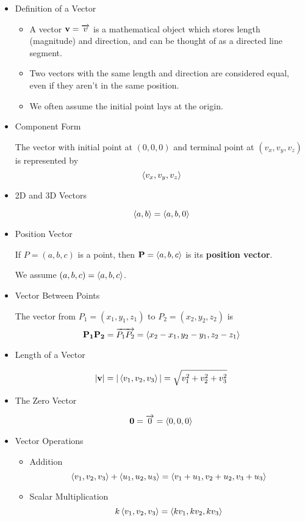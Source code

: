   \begin{itemize}
  \item Definition of a Vector
  
    \begin{itemize}
    \item A vector $\mathbf{v}=\overrightarrow{v}$ is a mathematical object which stores length (magnitude) and direction, and can be thought of as a directed line segment.
  
    \item Two vectors with the same length and direction are considered equal, even if they aren't in the same position. 

    \item We often assume the initial point lays at the origin.
    \end{itemize}
    
  \item Component Form
  
    The vector with initial point at $(0,0,0)$ and terminal point at $(v_x,v_y,v_z)$ is represented by \[\left<v_x,v_y,v_z\right>\]
    
  \item 2D and 3D Vectors
  
    \[\left<a,b\right>=\left<a,b,0\right>\]
    
  \item Position Vector
  
    If $P=(a,b,c)$ is a point, then $\mathbf{P}=\left<a,b,c\right>$ is its \textbf{position vector}. 

    We assume $(a,b,c)=\left<a,b,c\right>$.

  \item Vector Between Points
  
  The vector from $P_1 = (x_1,y_1,z_1)$ to $P_2 = (x_2,y_2,z_2)$ is \[\mathbf{P_1P_2} = \overrightarrow{P_1P_2} = \left<x_2-x_1,y_2-y_1,z_2-z_1\right>\]

  \newpage
  
  \item Length of a Vector
  
    \[|\mathbf{v}| = |\left<v_1,v_2,v_3\right>| = \sqrt{v_1^2 + v_2^2 + v_3^2}\]
  
  \item The Zero Vector
  
  \[\mathbf{0} = \overrightarrow{0} = \left<0,0,0\right>\]
  
  \item Vector Operations
    \begin{itemize}
    \item Addition
      \[\left<v_1,v_2,v_3\right> + \left<u_1,u_2,u_3\right> = \left<v_1+u_1,v_2+u_2,v_3+u_3\right>\]
    \item Scalar Multiplication
      \[k\left<v_1,v_2,v_3\right> = \left<kv_1,kv_2,kv_3\right> \]
    \end{itemize}


\end{itemize}
